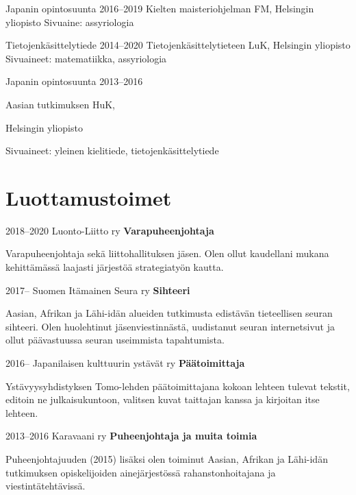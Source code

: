 \documentclass{tccv_fin}
\begin{document}
\begin{yearlist}

\item[Japanin opintosuunta]{2016--2019}
     {Kielten maisteriohjelman FM, Helsingin yliopisto}
     {Sivuaine: assyriologia}
     
\item[Tietojenkäsittelytiede]{2014--2020}
     {Tietojenkäsittelytieteen LuK, Helsingin yliopisto}
     {Sivuaineet: matematiikka, assyriologia}
     
\item[Japanin opintosuunta]{2013--2016}
     {Aasian tutkimuksen HuK, 
     
     Helsingin yliopisto}
     {Sivuaineet: yleinen kielitiede, tietojenkäsittelytiede}
\end{yearlist}     




\section{Luottamustoimet}
\begin{eventlist}

\item{2018--2020}
     {Luonto-Liitto ry}
     {\textbf{Varapuheenjohtaja}}
     
     Varapuheenjohtaja sekä liittohallituksen jäsen. Olen ollut kaudellani mukana kehittämässä laajasti järjestöä stra\-te\-gia\-työn kautta.

\item{2017--}
     {Suomen Itämainen Seura ry}
     {\textbf{Sihteeri}}
     
     Aasian, Afrikan ja Lähi-idän alueiden tutkimusta edis\-tä\-vän tieteellisen seuran sihteeri. Olen huo\-leh\-ti\-nut jä\-sen\-vies\-tin\-nästä, uudistanut seuran in\-ter\-net\-si\-vut ja ollut päävastuussa seuran useimmista ta\-pah\-tu\-mis\-ta.

\item{2016--}
     {Japanilaisen kulttuurin ystävät ry}
    {\textbf{Päätoimittaja}}
     
   	 Ystävyysyhdistyksen Tomo-lehden päätoimittajana ko\-koan lehteen tulevat tekstit, editoin ne julkaisukuntoon, valitsen kuvat taittajan kanssa ja kirjoitan itse lehteen.
     
\item{2013--2016}
     {Karavaani ry}
     {\textbf{Puheenjohtaja ja muita toimia}}
     
     Puheenjohtajuuden (2015) lisäksi olen toiminut Aasian, Afrikan ja Lähi-idän tutkimuksen opiskelijoiden aine\-jär\-jestössä rahanstonhoitajana ja viestintätehtävissä.%
     
     
\end{eventlist}
\end{document}
